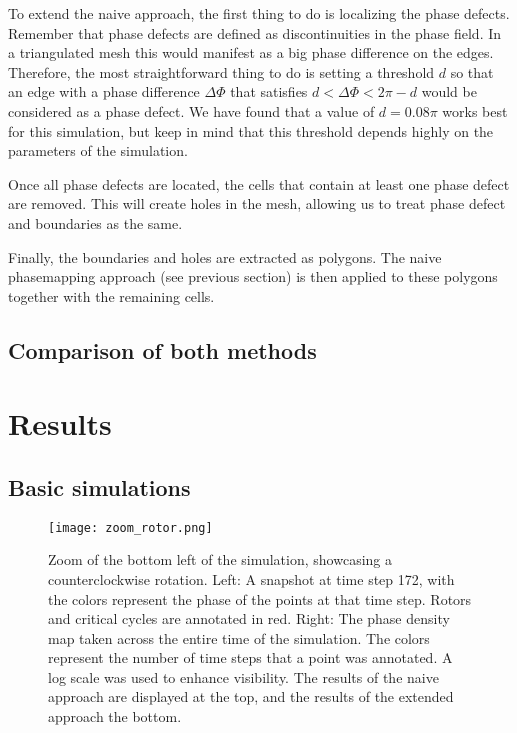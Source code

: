 \documentclass[twocolumn]{article}
\begin{document}
To extend the naive approach, the first thing to do is localizing the
phase defects. Remember that phase defects are defined as
discontinuities in the phase field. In a triangulated mesh this would
manifest as a big phase difference on the edges. Therefore, the most
straightforward thing to do is setting a threshold \(d\) so that an edge
with a phase difference \(\Delta\Phi\) that satisfies
\(d<\Delta\Phi<2\pi-d\) would be considered as a phase defect. We have
found that a value of \(d=0.08\pi\) works best for this simulation, but
keep in mind that this threshold depends highly on the parameters of the
simulation.

Once all phase defects are located, the cells that contain at least one
phase defect are removed. This will create holes in the mesh, allowing
us to treat phase defect and boundaries as the same.

Finally, the boundaries and holes are extracted as polygons. The naive
phasemapping approach (see previous section) is then applied to these
polygons together with the remaining cells.

\subsection{Comparison of both methods}

\section{Results}

\subsection{Basic simulations}

\begin{figure}[ht]
  \centering
  \texttt{[image: zoom\_rotor.png]}
  \caption{Zoom of the bottom left of the simulation, showcasing a
    counterclockwise rotation. Left: A snapshot at time step 172, with the
    colors represent the phase of the points at that time step. Rotors and
    critical cycles are annotated in red. Right: The phase density map taken
    across the entire time of the simulation. The colors represent the
    number of time steps that a point was annotated. A log scale was used to
    enhance visibility. The results of the naive approach are displayed at
  the top, and the results of the extended approach the bottom.}
  \label{fig:zoom-rotor}
\end{figure}
\end{document}
